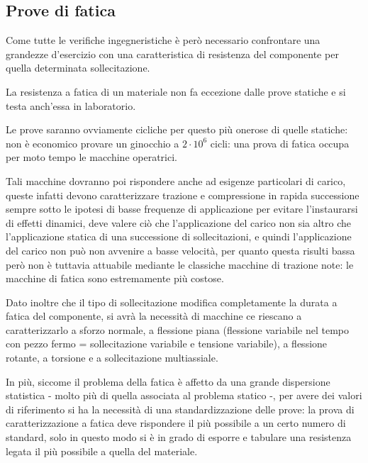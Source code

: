 \subsection{Prove di fatica}


		  
		  Come tutte le verifiche ingegneristiche è però necessario confrontare una grandezze d'esercizio con una caratteristica di resistenza del componente per quella determinata sollecitazione.
		  
		  La resistenza a fatica di un materiale non fa eccezione dalle prove statiche e si testa anch'essa in laboratorio.
		  
		  Le prove saranno ovviamente cicliche per questo più onerose di quelle statiche: non è economico provare un ginocchio a $2\cdot10^6$ cicli: una prova di fatica occupa per moto tempo le macchine operatrici.
		  
		  Tali macchine dovranno poi rispondere anche ad esigenze particolari di carico, queste infatti devono caratterizzare trazione e compressione in rapida successione sempre sotto le ipotesi di basse frequenze di applicazione per evitare l'instaurarsi di effetti dinamici, deve valere ciò che l'applicazione del carico non sia altro che l'applicazione statica di una successione di sollecitazioni, e quindi l'applicazione del carico non può non avvenire a basse velocità, per quanto questa risulti bassa però non è tuttavia attuabile mediante le classiche macchine di trazione note: le macchine di fatica sono estremamente più costose. 
		  
		  Dato inoltre che il tipo di sollecitazione modifica completamente la durata a fatica del componente, si avrà la necessità di macchine ce riescano a caratterizzarlo a sforzo normale, a flessione piana (flessione variabile nel tempo con pezzo fermo = sollecitazione variabile e tensione variabile), a flessione rotante, a torsione e a sollecitazione multiassiale. \newline
		  
		  In più, siccome il problema della fatica è affetto da una grande dispersione statistica - molto più di quella associata al problema statico -, per avere dei valori di riferimento si ha la necessità di una standardizzazione delle prove: la prova di caratterizzazione a fatica deve rispondere il più possibile a un certo numero di standard, solo in questo modo si è in grado di esporre e tabulare una resistenza legata il più possibile a quella del materiale.\newline
		  
